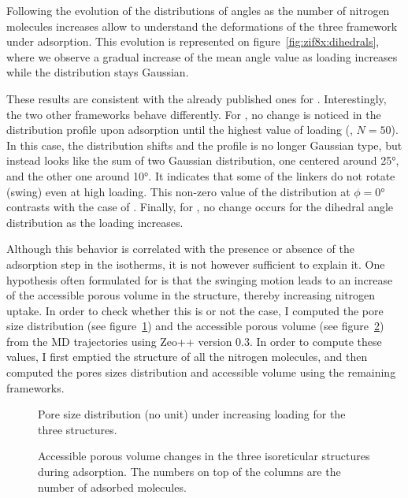 \documentclass[thesis]{subfiles}
\begin{document}
Following the evolution of the distributions of angles as the number of nitrogen
molecules increases allow to understand the deformations of the three framework
under adsorption. This evolution is represented on
figure~\ref{fig:zif8x:dihedrals}, where we observe a gradual increase of the
mean angle value as loading increases while the distribution stays Gaussian.

These results are consistent with the already published ones for
\cite{Coudert2017}. Interestingly, the two other frameworks behave
differently. For \ZIFCl, no change is noticed in the distribution profile upon
adsorption until the highest value of loading (\ie, $N = 50$). In this case, the
distribution shifts and the profile is no longer Gaussian type, but instead
looks like the sum of two Gaussian distribution, one centered around 25°, and
the other one around 10°. It indicates that some of the linkers do not rotate
(swing) even at high loading. This non-zero value of the distribution at $\phi =
0\text{°}$ contrasts with the case of . Finally, for \ZIFBr, no change
occurs for the dihedral angle distribution as the loading increases.

Although this behavior is correlated with the presence or absence of the
adsorption step in the isotherms, it is not however sufficient to explain it.
One hypothesis often formulated for  is that the swinging motion leads to
an increase of the accessible porous volume in the structure, thereby increasing
nitrogen uptake. In order to check whether this is or not the case, I computed
the pore size distribution (see figure~\ref{fig:zif8x:pores-sizes}) and the
accessible porous volume (see figure~\ref{fig:zif8x:porous-volume}) from the MD
trajectories using Zeo++\cite{Willems2012} version 0.3. In order to compute
these values, I first emptied the structure of all the nitrogen molecules, and
then computed the pores sizes distribution and accessible volume using the
remaining frameworks.

\begin{figure}[ht]
    \centering
    
    \caption{Pore size distribution (no unit) under increasing loading for the
    three structures.}
    \label{fig:zif8x:pores-sizes}
\end{figure}

\begin{figure}[ht]
    \centering
    
    \caption{Accessible porous volume changes in the three isoreticular
    structures during adsorption. The numbers on top of the columns are the
    number of adsorbed  molecules.}
    \label{fig:zif8x:porous-volume}
\end{figure}
\end{document}
